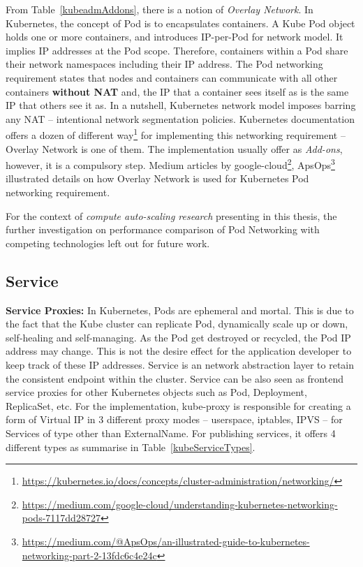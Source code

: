 From Table~\ref{kubeadmAddons}, there is a notion of \emph{Overlay Network}. In Kubernetes, the concept of Pod is to encapsulates containers. A Kube Pod object holds one or more containers, and introduces IP-per-Pod for network model. It implies IP addresses at the Pod scope. Therefore, containers within a Pod share their network namespaces including their IP address. The Pod networking requirement\parencite{kubeDoc} states that nodes and containers can communicate with all other containers \textbf{without NAT} and, the IP that a container sees itself as is the same IP that others see it as. In a nutshell, Kubernetes network model imposes barring any NAT -- intentional network segmentation policies. Kubernetes documentation offers a dozen of different way\footnote{\url{https://kubernetes.io/docs/concepts/cluster-administration/networking/}} for implementing this networking requirement -- Overlay Network is one of them. The implementation usually offer as \emph{Add-ons}, however, it is a compulsory step. Medium articles by google-cloud\footnote{\url{https://medium.com/google-cloud/understanding-kubernetes-networking-pods-7117dd28727}}, ApsOps\footnote{\url{https://medium.com/@ApsOps/an-illustrated-guide-to-kubernetes-networking-part-2-13fdc6c4e24c}} illustrated details on how Overlay Network is used for Kubernetes Pod networking requirement.

For the context of \emph{compute auto-scaling research} presenting in this thesis, the further investigation on performance comparison of Pod Networking with competing technologies left out for future work.

\subsection{Service}
\label{kubeService}
\noindent \textbf{Service Proxies:} \quad In Kubernetes, Pods are ephemeral and mortal. This is due to the fact that the Kube cluster can replicate Pod, dynamically scale up or down, self-healing and self-managing. As the Pod get destroyed or recycled, the Pod IP address may change. This is not the desire effect for the application developer to keep track of these IP addresses. Service is an network abstraction layer to retain the consistent endpoint within the cluster. Service can be also seen as frontend service proxies for other Kubernetes objects such as Pod, Deployment, ReplicaSet, etc. For the implementation, kube-proxy is responsible for creating a form of Virtual IP in 3 different proxy modes -- userspace, iptables, IPVS --  for Services of type other than ExternalName. For publishing services, it offers 4 different types as summarise in Table~\ref{kubeServiceTypes}.

